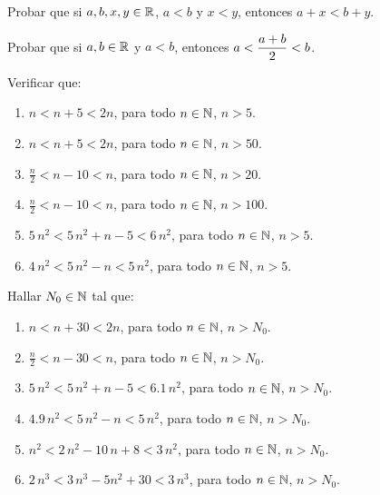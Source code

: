 
    \item Probar que si $a,b,x,y \in \mathbb{R}$, $a<b$ y $x<y$, entonces $a+x < b+y$.

    \item Probar que si $a,b\in\mathbb{R}$ y $a<b$, entonces $\displaystyle a<\frac{a+b}2<b$.

    \item Verificar que:
    \begin{enumerate}
        \item $n < n + 5 < 2 n$, para todo $n\in\mathbb{N}$, $n > 5$.
        \item $n < n + 5 < 2 n$, para todo $n\in\mathbb{N}$, $n > 50$.
        \item $\frac n2 < n - 10 < n$, para todo $n\in\mathbb{N}$, $n > 20$.
        \item $\frac n2 < n - 10 < n$, para todo $n\in\mathbb{N}$, $n > 100$.
        \item $5\, n^2 < 5\,n^2 + n - 5 < 6\, n^2$, para todo $n\in\mathbb{N}$, $n > 5$.
        \item $4\, n^2 < 5\,n^2 - n  < 5\, n^2$, para todo $n\in\mathbb{N}$, $n > 5$.
    \end{enumerate}

    \item Hallar $N_0\in\mathbb{N}$ tal que:
    \begin{enumerate}
        \item $n < n + 30 < 2 n$, para todo $n\in\mathbb{N}$, $n > N_0$.
        \item $\frac n2 < n - 30 < n$, para todo $n\in\mathbb{N}$, $n > N_0$.
        \item $5\, n^2 < 5\,n^2 + n - 5 < 6.1\, n^2$, para todo $n\in\mathbb{N}$, $n > N_0$.
        \item $4.9\, n^2 < 5\, n^2 - n  < 5\, n^2$, para todo $n\in\mathbb{N}$, $n > N_0$.
        \item $n^2 < 2\,n^2 - 10\, n + 8 < 3\, n^2$, para todo $n\in\mathbb{N}$, $n > N_0$.
        \item $2\, n^3 < 3\,n^3 - 5 n^2 + 30 < 3\, n^3$, para todo $n\in\mathbb{N}$, $n > N_0$.
    \end{enumerate}

